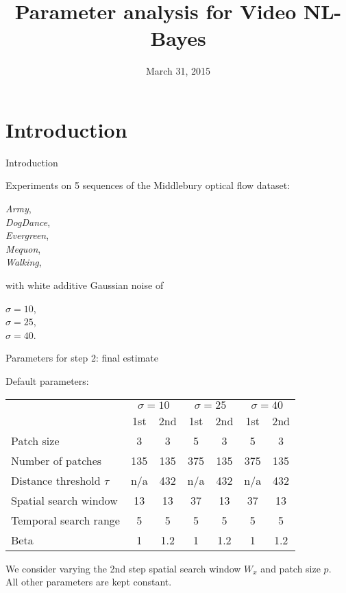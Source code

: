 \documentclass[mathserif, 8pt]{beamer}
\title[VNLB - Parameter Analysis]{$\,$ \\ $\,$ \\ Parameter analysis for Video NL-Bayes}
\author[Pablo Arias]{March 31, 2015}
\institute[CMLA]{}
\date[]{}
\begin{document}
\begin{frame}
    \titlepage
\end{frame}

\section{Introduction}

\begin{frame}{Introduction}

	\begin{center}
	Experiments on 5 sequences of the Middlebury optical flow dataset:

	\bigskip

	\emph{Army}, \\
	\emph{DogDance}, \\
	\emph{Evergreen}, \\
	\emph{Mequon}, \\
	\emph{Walking},

	\bigskip

	with white additive Gaussian noise of 

	\bigskip
	
	$\sigma = 10$, \\ 
	$\sigma = 25$, \\ 
	$\sigma = 40$.
	\end{center}

\end{frame}

\begin{frame}{Parameters for step 2: final estimate}
	\begin{center}

	Default parameters:

	\bigskip

	\begin{tabular}{l | c c | c c | c c }
		& \multicolumn{2}{c|}{$\sigma = 10$} 
		& \multicolumn{2}{c|}{$\sigma = 25$} 
		& \multicolumn{2}{c}{$\sigma = 40$} \\
		                            & 1st  & 2nd  & 1st  & 2nd  & 1st  & 2nd \\\hline\hline
		Patch size                  &  3   &   3  &  5   &   3  &  5   &   3 \\
		Number of patches           & 135  & 135  & 375  & 135  & 375  & 135 \\
		Distance threshold $\tau$   & n/a  & 432  & n/a  & 432  & n/a  & 432 \\
		Spatial search window       & 13   & 13   & 37   & 13   & 37   & 13  \\
		Temporal search range       & 5    & 5    & 5    & 5    & 5    & 5   \\\hline
		Beta                        & 1    & 1.2  & 1    & 1.2  & 1    & 1.2 \\\hline
	\end{tabular}

	\bigskip
	\bigskip
	\bigskip

	We consider varying the 2nd step spatial search window $W_x$ and patch size $p$.\\ All other parameters are kept constant.

	\end{center}
\end{frame}
\end{document}
